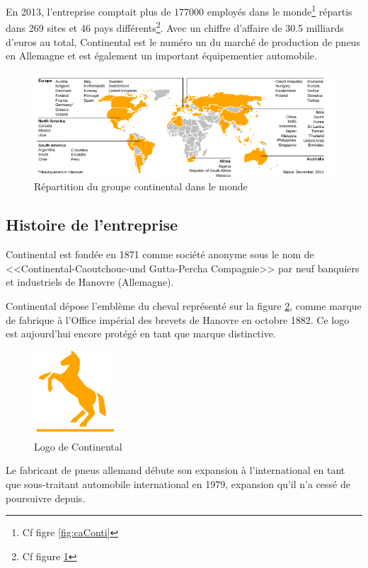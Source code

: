 		 En 2013, l'entreprise comptait plus de $177000$ employés dans le monde\footnote{Cf figre \ref{fig:caConti}} répartis dans 269 sites et 46 pays différents\footnote{Cf figure \ref{fig:repartitionConti}}. Avec un chiffre d'affaire de 30.5 milliards d'euros au total, Continental est le numéro un du marché de production de pneus en Allemagne et est également un important équipementier automobile.
		 \begin{figure}[H]
		 	\centering
		 	\includegraphics[width=18cm]{contents/images/repartitionConti.png}
		 	\caption{Répartition du groupe continental dans le monde}
		 	\label{fig:repartitionConti}
		 \end{figure}		 

		\subsection{Histoire de l'entreprise}
		Continental est fondée en 1871 comme société anonyme sous le nom de <<Continental-Caoutchouc-und Gutta-Percha Compagnie>> par neuf banquiers et industriels de Hanovre (Allemagne).

		Continental dépose l'emblème du cheval représenté sur la figure \ref{fig:logo}, comme marque de fabrique à l'Office impérial des brevets de Hanovre en octobre 1882. Ce logo est aujourd'hui encore protégé en tant que marque distinctive.
		\begin{figure}[H]
			\centering
			\includegraphics[width=3cm]{contents/images/logoConti.png}
			\caption{Logo de Continental}
			\label{fig:logo}
		\end{figure}

		Le fabricant de pneus allemand débute son expansion à l'international en tant que sous-traitant automobile international en 1979, expansion qu'il n'a cessé de poursuivre depuis.
		
